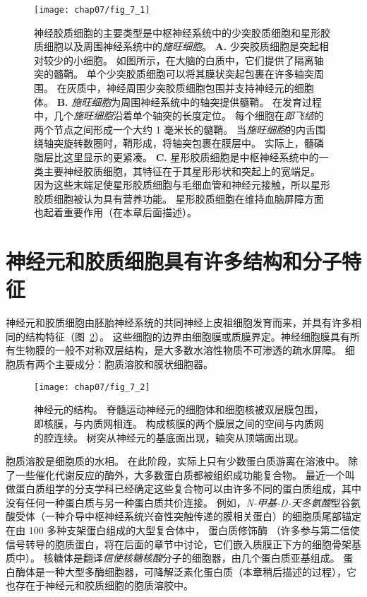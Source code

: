 \begin{figure}[htbp]
	\centering
	\texttt{[image: chap07/fig\_7\_1]}
	\caption{神经胶质细胞的主要类型是中枢神经系统中的少突胶质细胞和星形胶质细胞以及周围神经系统中的\textit{施旺细胞}。
		\textbf{A.} 少突胶质细胞是突起相对较少的小细胞。
		如图所示，在大脑的白质中，它们提供了隔离轴突的髓鞘。
		单个少突胶质细胞可以将其膜状突起包裹在许多轴突周围。
		在灰质中，神经周围少突胶质细胞包围并支持神经元的细胞体。
		\textbf{B.} \textit{施旺细胞}为周围神经系统中的轴突提供髓鞘。
		在发育过程中，几个\textit{施旺细胞}沿着单个轴突的长度定位。
		每个细胞在\textit{郎飞结}的两个节点之间形成一个大约 1 毫米长的髓鞘。
		当\textit{施旺细胞}的内舌围绕轴突旋转数圈时，鞘形成，将轴突包裹在膜层中。
		实际上，髓磷脂层比这里显示的更紧凑。
		\textbf{C.} 星形胶质细胞是中枢神经系统中的一类主要神经胶质细胞，其特征在于其星形形状和突起上的宽端足。 因为这些末端足使星形胶质细胞与毛细血管和神经元接触，所以星形胶质细胞被认为具有营养功能。 星形胶质细胞在维持血脑屏障方面也起着重要作用（在本章后面描述）。}
	\label{fig:7_1}
\end{figure}


\section{神经元和胶质细胞具有许多结构和分子特征}

神经元和胶质细胞由胚胎神经系统的共同神经上皮祖细胞发育而来，并具有许多相同的结构特征（图~\ref{fig:7_2}）。
这些细胞的边界由细胞膜或质膜界定。神经细胞膜具有所有生物膜的一般不对称双层结构，是大多数水溶性物质不可渗透的疏水屏障。
细胞质有两个主要成分：胞质溶胶和膜状细胞器。


\begin{figure}[htbp]
	\centering
	\texttt{[image: chap07/fig\_7\_2]}
	\caption{神经元的结构。
		脊髓运动神经元的细胞体和细胞核被双层膜包围，即核膜，与内质网相连。
		构成核膜的两个膜层之间的空间与内质网的腔连续。
		树突从神经元的基底面出现，轴突从顶端面出现\cite{williams1989bannister}。}
	\label{fig:7_2}
\end{figure}


胞质溶胶是细胞质的水相。
在此阶段，实际上只有少数蛋白质游离在溶液中。
除了一些催化代谢反应的酶外，大多数蛋白质都被组织成功能复合物。
最近一个叫做蛋白质组学的分支学科已经确定这些复合物可以由许多不同的蛋白质组成，其中没有任何一种蛋白质与另一种蛋白质共价连接。
例如，\textit{N-甲基-D-天冬氨酸}型谷氨酸受体（一种介导中枢神经系统兴奋性突触传递的膜相关蛋白）的细胞质尾部锚定在由 100 多种支架蛋白组成的大型复合体中， 蛋白质修饰酶
（许多参与第二信使信号转导的胞质蛋白，将在后面的章节中讨论，它们嵌入质膜正下方的细胞骨架基质中）。
核糖体是翻译\textit{信使核糖核酸}分子的细胞器，由几个蛋白质亚基组成。
蛋白酶体是一种大型多酶细胞器，可降解泛素化蛋白质（本章稍后描述的过程），它也存在于神经元和胶质细胞的胞质溶胶中。


